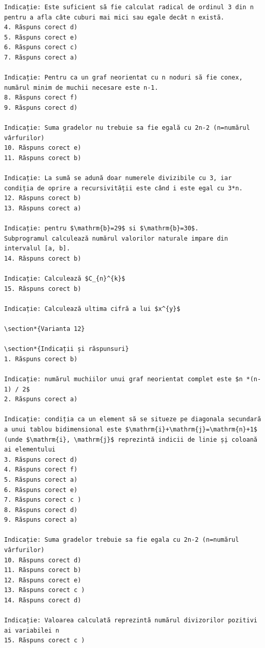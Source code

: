 \documentclass[10pt]{article}
\begin{document}
\begin{verbatim}
Indicație: Este suficient să fie calculat radical de ordinul 3 din n pentru a afla câte cuburi mai mici sau egale decât n există.
4. Răspuns corect d)
5. Răspuns corect e)
6. Răspuns corect c)
7. Răspuns corect a)

Indicație: Pentru ca un graf neorientat cu n noduri să fie conex, numărul minim de muchii necesare este n-1.
8. Răspuns corect f)
9. Răspuns corect d)

Indicație: Suma gradelor nu trebuie sa fie egală cu 2n-2 (n=numărul vârfurilor)
10. Răspuns corect e)
11. Răspuns corect b)

Indicație: La sumă se adună doar numerele divizibile cu 3, iar condiția de oprire a recursivității este când i este egal cu 3*n.
12. Răspuns corect b)
13. Răspuns corect a)

Indicație: pentru $\mathrm{b}=29$ si $\mathrm{b}=30$.
Subprogramul calculează numărul valorilor naturale impare din intervalul [a, b].
14. Răspuns corect b)

Indicație: Calculează $C_{n}^{k}$
15. Răspuns corect b)

Indicație: Calculează ultima cifră a lui $x^{y}$

\section*{Varianta 12}

\section*{Indicații și răspunsuri}
1. Răspuns corect b)

Indicație: numărul muchiilor unui graf neorientat complet este $n *(n-1) / 2$
2. Răspuns corect a)

Indicație: condiția ca un element să se situeze pe diagonala secundară a unui tablou bidimensional este $\mathrm{i}+\mathrm{j}=\mathrm{n}+1$ (unde $\mathrm{i}, \mathrm{j}$ reprezintă indicii de linie ș̦i coloană ai elementului
3. Răspuns corect d)
4. Răspuns corect f)
5. Răspuns corect a)
6. Răspuns corect e)
7. Răspuns corect c )
8. Răspuns corect d)
9. Răspuns corect a)

Indicație: Suma gradelor trebuie sa fie egala cu 2n-2 (n=numărul vârfurilor)
10. Răspuns corect d)
11. Răspuns corect b)
12. Răspuns corect e)
13. Răspuns corect c )
14. Răspuns corect d)

Indicație: Valoarea calculată reprezintă numărul divizorilor pozitivi ai variabilei n
15. Răspuns corect c )


\end{verbatim}
\end{document}
